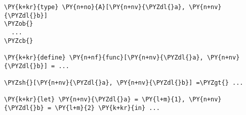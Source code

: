 \begin{Verbatim}[commandchars=\\\{\}]
\PY{k+kr}{type} \PY{n+no}{A}[\PY{n+nv}{\PYZdl{}a}, \PY{n+nv}{\PYZdl{}b}]
\PYZob{}
  ...
\PYZcb{}

\PY{k+kr}{define} \PY{n+nf}{func}[\PY{n+nv}{\PYZdl{}a}, \PY{n+nv}{\PYZdl{}b}] = ...

\PYZsh{}[\PY{n+nv}{\PYZdl{}a}, \PY{n+nv}{\PYZdl{}b}] =\PYZgt{} ...

\PY{k+kr}{let} \PY{n+nv}{\PYZdl{}a} = \PY{l+m}{1}, \PY{n+nv}{\PYZdl{}b} = \PY{l+m}{2} \PY{k+kr}{in} ...
\end{Verbatim}
